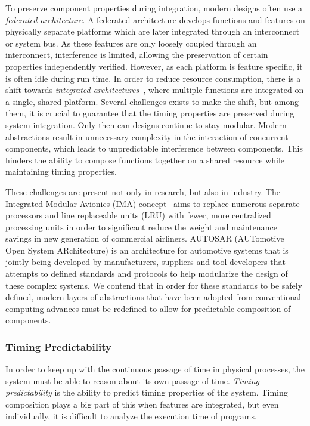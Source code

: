To preserve component properties during integration, modern designs often use a \textit{federated architecture}.
A federated architecture develops functions and features on physically separate platforms which are later integrated through an interconnect or system bus. 
As these features are only loosely coupled through an interconnect, interference is limited, allowing the preservation of certain properties independently verified. 
However, as each platform is feature specific, it is often idle during run time.
In order to reduce resource consumption, there is a shift towards \textit{integrated architectures}~\cite{Obermaisser2009FedtoIMA,AvionicsWatkins2007IMA}, where multiple functions are integrated on a single, shared platform.
Several challenges exists to make the shift, but among them, it is crucial to guarantee that the timing properties are preserved during system integration.
Only then can designs continue to stay modular. 
Modern abstractions result in unnecessary complexity in the interaction of concurrent components, which leads to unpredictable interference between components. 
This hinders the ability to compose functions together on a shared resource while maintaining timing properties. 

These challenges are present not only in research, but also in industry.  
The Integrated Modular Avionics (IMA) concept~\cite{IMA} aims to replace numerous separate processors and line replaceable units (LRU) with fewer, more centralized processing units in order to significant reduce the weight and maintenance savings in new generation of commercial airliners.
AUTOSAR (AUTomotive Open System ARchitecture)\cite{autosarsite} is an architecture for automotive systems that is jointly being developed by manufacturers, suppliers and tool developers that attempts to defined standards and protocols to help modularize the design of these complex systems.
We contend that in order for these standards to be safely defined, modern layers of abstractions that have been adopted from conventional computing advances must be redefined to allow for  predictable composition of components.  

\subsubsection{Timing Predictability}
In order to keep up with the continuous passage of time in physical processes, the system must be able to reason about its own passage of time.
\textit{Timing predictability} is the ability to predict timing properties of the system.
Timing composition plays a big part of this when features are integrated, but even individually, it is difficult to analyze the execution time of programs.


